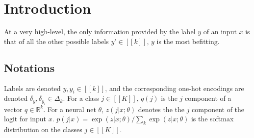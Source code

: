 \section{Introduction}
At a very high-level, the only information provided by the label $y$ of an input
$x$ is that of all the other possible labels $y' \in [\![k]\!]$, $y$ is the most
befitting.

\subsection{Notations}
Labels are
denoted $y, y_i \in [\![k]\!]$, and the corresponding one-hot encodings are
denoted $\delta_{y},\delta_{y_i} \in \Delta_k$. For a class $j \in [\![K]\!]$,
$q(j)$ is the $j$ component of a vector $q \in \mathbb R^k$. For a neural net
$\theta$, $z(j|x;\theta)$ denotes the the $j$ component of the logit for input
$x$. $p(j|x)=\exp(z|x;\theta)/\sum_{k}\exp(z|x;\theta)$ is the softmax
distribution on the classes $j\in[\![K]\!]$.
